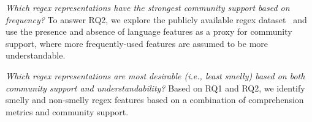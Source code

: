 {\em Which regex representations have the strongest {community support} based on frequency?} %
To answer RQ2, we explore the publicly available regex dataset~\cite{chapman2016} and use the presence and absence of language features as a proxy for community support, where more frequently-used features are assumed to be more understandable.

 {\em Which regex representations are most desirable (i.e., least smelly) based on both community support and understandability?}
Based on RQ1 and RQ2, we identify smelly and non-smelly regex features based on a combination of comprehension metrics and community support.


%
%
%
%
%
%
%




